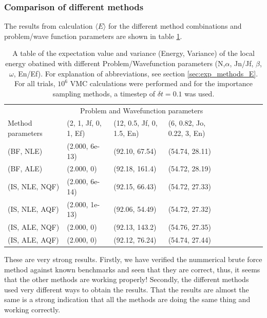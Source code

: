 \subsubsection{Comparison of different methods}

The results from calculation $\langle E \rangle$ for the different method combinations and problem/wave function parameters are shown in table \ref{tab:methods_E}.

\begin{table}[h!]
	\centering
	\begin{tabular}{l @{ } l @{ } l @{ } l @{ } l @{ } l @{ } l  @{ } l  @{ } l  @{ } l }
	\toprule
	  & \multicolumn{3}{c}{Problem and Wavefunction parameters} \\
	 Method parameters $~~~~$ & (2, 1, Jf, 0, 1, Ef) $~$ & (12, 0.5, Jf, 0, 1.5, En) $~$ & (6, 0.82, Jo, 0.22, 3, En)  \\
	\midrule
	(BF, NLE) & 				(2.000, 6e-13)		&		(92.10, 67.54)		&		(54.74, 28.11)			\\
	\shaderow (BF, ALE)	 &		(2.000, 0)			&		(92.18, 161.4)		&		(54.72, 28.19)		\\
	(IS, NLE, NQF) & 			(2.000, 6e-14)		&		(92.15, 66.43)		&		(54.72, 27.33)				 \\
	\shaderow(IS, NLE, AQF) &	(2.000, 1e-13) 		&		(92.06, 54.49)		&		(54.72, 27.32)						\\
	(IS, ALE, NQF) &			(2.000, 0)			&		(92.13, 143.2)		&		(54.76, 27.35)					\\
	\shaderow (IS, ALE, AQF) &	(2.000, 0) 			&		(92.12, 76.24)		&		(54.74, 27.44)	 				\\
	\bottomrule
	\end{tabular}
	\caption{A table of the expectation value and variance (Energy, Variance) of the local energy obatined with different Problem/Wavefunction parameters (N,$\alpha$, Jn/Jf, $\beta$, $\omega$, En/Ef). For explanation of abbreviations, see section \ref{sec:exp_methods_E}.
	For all trials, $10^6$ VMC calculations were performed and for the importance sampling methods, a timestep of $\delta t = 0.1$ was used.}
	\label{tab:methods_E}
\end{table}

These are very strong results. 
Firstly, we have verified the nummerical brute force method against known benchmarks and seen that they are correct,
thus, it seems that the other methods are working properly!
Secondly, the different methods used very different ways to obtain the results. 
That the results are almost the same is a strong indication that all the methods are doing the same thing and working correctly. 

